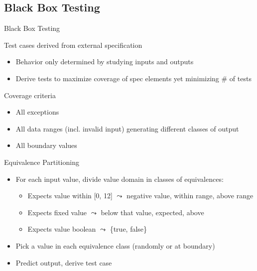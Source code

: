 \subsection{Black Box Testing}
\begin{frame}{Black Box Testing}
  \bigskip

  \begin{block}{Test cases derived from external specification}
    \begin{itemize}
    \item Behavior only determined by studying inputs and outputs
    \item Derive tests to maximize coverage of spec elements yet minimizing
      \# of tests
    \end{itemize}
  \end{block}\vspace{-.5\baselineskip}

  \begin{block}{Coverage criteria}
    \begin{itemize}
    \item All exceptions
    \item All data ranges (incl. invalid input) generating different classes of
      output
    \item All boundary values
    \end{itemize}
  \end{block}\vspace{-.5\baselineskip}

  \begin{block}{Equivalence Partitioning}
    \begin{itemize}
    \item For each input value, divide value domain in classes of
      equivalences:
      \begin{itemize}
      \item Expects value within [0, 12] $\leadsto$ negative value, within
        range, above range
      \item Expects fixed value $\leadsto$ below that value, expected, above
      \item Expects value boolean $\leadsto$ \{true, false\}
      \end{itemize}
    \item Pick a value in each equivalence class (randomly or at boundary)
    \item Predict output, derive test case

    \end{itemize}
  \end{block}
\end{frame}
